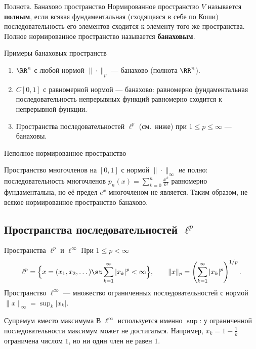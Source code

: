 \begin{Definition}{Полнота. Банахово пространство}{}
	Нормированное пространство $V$ называется \textbf{полным}, если всякая
	фундаментальная (сходящаяся в себе по Коши) последовательность его
	элементов сходится к элементу того же пространства. Полное нормированное
	пространство называется \textbf{банаховым}.
\end{Definition}

\begin{Example}{Примеры банаховых пространств}{}
	\begin{enumerate}
		\item $\RR^n$ с любой нормой $\|\cdot\|_p$ --- банахово (полнота $\RR^n$).
		\item $C[0,1]$ с равномерной нормой --- банахово: равномерно
		фундаментальная последовательность непрерывных функций равномерно
		сходится к непрерывной функции.
		\item Пространства последовательностей $\ell^p$ (см.\ ниже) при
		$1\le p\le\infty$ --- банаховы.
	\end{enumerate}
\end{Example}

\begin{Example}{Неполное нормированное пространство}{}

	Пространство многочленов на $[0,1]$ с нормой $\|\cdot\|_\infty$ \emph{не}
	полно: последовательность многочленов $p_n(x)=\sum_{k=0}^{n}\frac{x^k}{k!}$
	равномерно фундаментальна, но её предел $e^x$ многочленом не является.
	Таким образом, не всякое нормированное пространство банахово.
\end{Example}

\subsection*{Пространства последовательностей $\ell^p$}

\begin{Definition}{Пространства $\ell^p$ и $\ell^\infty$}{}
	При $1\le p<\infty$
	\[
	\ell^p=\Bigl\{x=(x_1,x_2,\dots)\st \sum_{k=1}^{\infty}|x_k|^p<\infty\Bigr\},
	\qquad
	\|x\|_p=\left(\sum_{k=1}^{\infty}|x_k|^p\right)^{1/p}.
	\]
	Пространство $\ell^\infty$ --- множество ограниченных последовательностей с
	нормой $\|x\|_\infty=\sup_{k}|x_k|$.
\end{Definition}

\begin{Remark}{Супремум вместо максимума}{}
	В $\ell^\infty$ используется именно $\sup$: у ограниченной
	последовательности максимум может не достигаться. Например,
	$x_k=1-\frac1k$ ограничена числом $1$, но ни один член не равен $1$.
\end{Remark}

